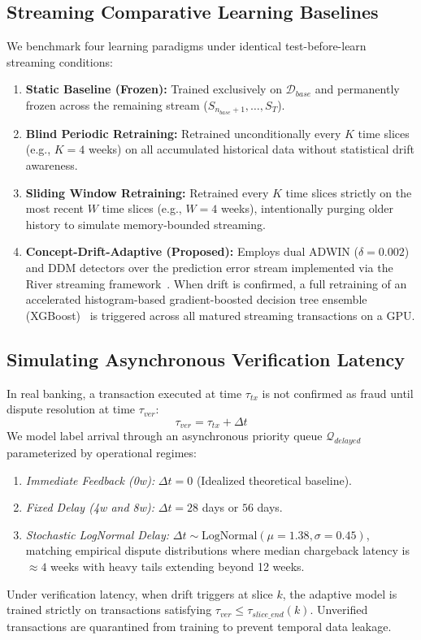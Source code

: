 \documentclass[10pt,conference,compsoc]{IEEEtran}
\begin{document}
\subsection{Streaming Comparative Learning Baselines}
We benchmark four learning paradigms under identical test-before-learn streaming conditions:
\begin{enumerate}
    \item \textbf{Static Baseline (Frozen):} Trained exclusively on $\mathcal{D}_{base}$ and permanently frozen across the remaining stream ($S_{n_{base}+1}, \dots, S_T$).
    \item \textbf{Blind Periodic Retraining:} Retrained unconditionally every $K$ time slices (e.g., $K=4$ weeks) on all accumulated historical data without statistical drift awareness.
    \item \textbf{Sliding Window Retraining:} Retrained every $K$ time slices strictly on the most recent $W$ time slices (e.g., $W=4$ weeks), intentionally purging older history to simulate memory-bounded streaming.
    \item \textbf{Concept-Drift-Adaptive (Proposed):} Employs dual ADWIN ($\delta = 0.002$) and DDM detectors over the prediction error stream implemented via the River streaming framework~\cite{montiel2021river}. When drift is confirmed, a full retraining of an accelerated histogram-based gradient-boosted decision tree ensemble (XGBoost)~\cite{chen2016xgboost} is triggered across all matured streaming transactions on a GPU.
\end{enumerate}

\subsection{Simulating Asynchronous Verification Latency}
In real banking, a transaction executed at time $\tau_{tx}$ is not confirmed as fraud until dispute resolution at time $\tau_{ver}$:
\begin{equation}
    \tau_{ver} = \tau_{tx} + \Delta t
\end{equation}
We model label arrival through an asynchronous priority queue $\mathcal{Q}_{delayed}$ parameterized by operational regimes:
\begin{enumerate}
    \item \textit{Immediate Feedback (0w):} $\Delta t = 0$ (Idealized theoretical baseline).
    \item \textit{Fixed Delay (4w and 8w):} $\Delta t = 28$ days or $56$ days.
    \item \textit{Stochastic LogNormal Delay:} $\Delta t \sim \text{LogNormal}(\mu=1.38, \sigma=0.45)$, matching empirical dispute distributions where median chargeback latency is $\approx 4$ weeks with heavy tails extending beyond 12 weeks.
\end{enumerate}
Under verification latency, when drift triggers at slice $k$, the adaptive model is trained strictly on transactions satisfying $\tau_{ver} \le \tau_{slice\_end}(k)$. Unverified transactions are quarantined from training to prevent temporal data leakage.
\end{document}
